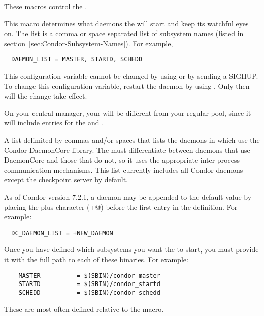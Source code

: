 These macros control the .
\begin{description}
  
\label{param:DaemonList}
\item[\Macro{DAEMON\_LIST}]
  This macro
  determines what daemons the  will start and keep its
  watchful eyes on.  The list is a comma or space separated list of
  subsystem names (listed in
  section~\ref{sec:Condor-Subsystem-Names}).  For example,
\begin{verbatim}
  DAEMON_LIST = MASTER, STARTD, SCHEDD
\end{verbatim}

  \Note This configuration variable cannot be changed 
  by using  or 
  by sending a SIGHUP.
  To change this configuration variable, restart the
   daemon
  by using .
  Only then will the change take effect.

  \Note On your central manager, your 
  will be different from your regular pool, since it will include
  entries for the  and .  
  
\label{param:DCDaemonList}
\item[\Macro{DC\_DAEMON\_LIST}]
  A list delimited by commas and/or spaces that
  lists the daemons in  which use the Condor
  DaemonCore library.  The  must differentiate between
  daemons that use DaemonCore and those that do not,
  so it uses the appropriate inter-process communication mechanisms.
  This list currently includes all Condor daemons except the checkpoint server
  by default.

  As of Condor version 7.2.1, a daemon may be appended to the default
   value by placing the plus character
  (\verb@+@) before the first entry in the  
  definition.
  For example:
\begin{verbatim}
  DC_DAEMON_LIST = +NEW_DAEMON
\end{verbatim}

\label{param:SUBSYS}
\item[\MacroB{<SUBSYS>}]
  Once you have defined which
  subsystems you want the  to start, you must provide
  it with the full path to each of these binaries.  For example:
  \begin{verbatim}
    MASTER          = $(SBIN)/condor_master
    STARTD          = $(SBIN)/condor_startd
    SCHEDD          = $(SBIN)/condor_schedd
  \end{verbatim}
  These are most often defined relative to the  macro.


\end{description}
